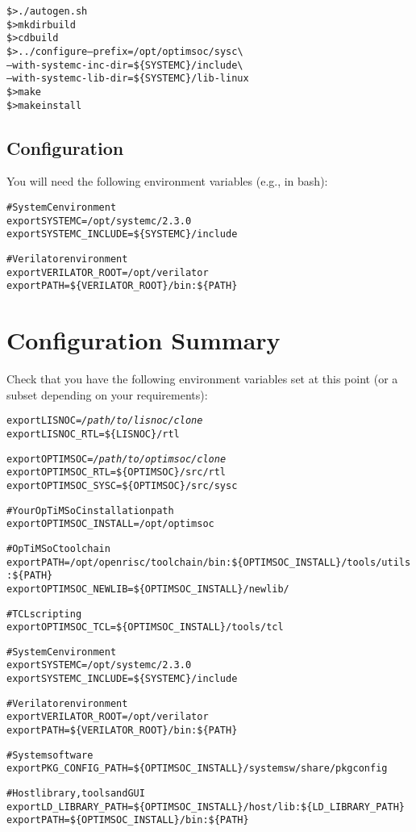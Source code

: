 \begin{alltt}
\$> ./autogen.sh
\$> mkdir build
\$> cd build
\$> ../configure --prefix=/opt/optimsoc/sysc \textbackslash
      --with-systemc-inc-dir=\$\{SYSTEMC\}/include \textbackslash
      --with-systemc-lib-dir=\$\{SYSTEMC\}/lib-linux
\$> make
\$> make install
\end{alltt}

\subsection{Configuration}

You will need the following environment variables (e.g., in bash):

\begin{alltt}
# SystemC environment
export SYSTEMC=/opt/systemc/2.3.0
export SYSTEMC_INCLUDE=\$\{SYSTEMC\}/include

# Verilator environment
export VERILATOR\_ROOT=/opt/verilator
export PATH=\$\{VERILATOR_ROOT\}/bin:\$\{PATH\}
\end{alltt}

\section{Configuration Summary}

Check that you have the following environment variables set at this
point (or a subset depending on your requirements):

\begin{alltt}
export LISNOC=\emph{/path/to/lisnoc/clone}
export LISNOC_RTL=\$\{LISNOC\}/rtl

export OPTIMSOC=\emph{/path/to/optimsoc/clone}
export OPTIMSOC_RTL=\$\{OPTIMSOC\}/src/rtl
export OPTIMSOC_SYSC=\$\{OPTIMSOC\}/src/sysc

# Your OpTiMSoC installation path
export OPTIMSOC_INSTALL=/opt/optimsoc

# OpTiMSoC toolchain
export PATH=/opt/openrisc/toolchain/bin:\$\{OPTIMSOC_INSTALL\}/tools/utils:\$\{PATH\}
export OPTIMSOC_NEWLIB=\$\{OPTIMSOC_INSTALL\}/newlib/

# TCL scripting
export OPTIMSOC_TCL=\$\{OPTIMSOC_INSTALL\}/tools/tcl

# SystemC environment
export SYSTEMC=/opt/systemc/2.3.0
export SYSTEMC_INCLUDE=\$\{SYSTEMC\}/include

# Verilator environment
export VERILATOR\_ROOT=/opt/verilator
export PATH=\$\{VERILATOR_ROOT\}/bin:\$\{PATH\}

# System software
export PKG_CONFIG_PATH=\$\{OPTIMSOC_INSTALL\}/systemsw/share/pkgconfig

# Host library, tools and GUI
export LD_LIBRARY_PATH=\$\{OPTIMSOC_INSTALL\}/host/lib:\$\{LD_LIBRARY_PATH\}
export PATH=\$\{OPTIMSOC_INSTALL\}/bin:\$\{PATH\}
\end{alltt}

